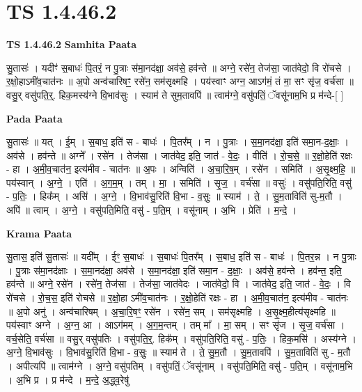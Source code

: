 \documentclass[17pt]{extarticle}
\begin{document}
\section*{ TS 1.4.46.2 }

\textbf{TS 1.4.46.2 } \newline
\textbf{Samhita Paata} \newline

सु॒तासः॑ । यदीꣳ॑ स॒बाधः॑ पि॒तरं॒ न पु॒त्राः स॑मा॒नद॑क्षा॒ अव॑से॒ हव॑न्ते ॥ अग्ने॒ रसे॑न॒ तेज॑सा॒ जात॑वेदो॒ वि रो॑चसे । र॒क्षो॒हाऽमी॑व॒चात॑नः ॥ अ॒पो अन्व॑चारिषꣳ॒॒ रसे॑न॒ सम॑सृक्ष्महि । पय॑स्वाꣳ अग्न॒ आऽग॑मं॒ तं मा॒ सꣳ सृ॑ज॒ वर्च॑सा ॥वसु॒र् वसु॑पति॒र्॒. हिक॒मस्य॑ग्ने वि॒भाव॑सुः । स्याम॑ ते सुम॒तावपि॑ ॥ त्वाम॑ग्ने॒ वसु॑पतिं॒ ॅवसू॑नाम॒भि प्र म॑न्दे-[ ] \newline

\textbf{Pada Paata} \newline

सु॒तासः॑ ॥ यत् । ई॒म् । स॒बाध॒ इति॑ स - बाधः॑ । पि॒तर᳚म् । न । पु॒त्राः । स॒मा॒नद॑क्षा॒ इति॑ समा॒न-द॒क्षाः॒ । अव॑से । हव॑न्ते ॥ अग्ने᳚ । रसे॑न । तेज॑सा । जात॑वेद॒ इति॒ जात॑ - वे॒दः॒ । वीति॑ । रो॒च॒से॒ ॥ र॒क्षो॒हेति॑ रक्षः - हा । अ॒मी॒व॒चात॑न॒ इत्य॑मीव - चात॑नः ॥ अ॒पः । अन्विति॑ । अ॒चा॒रि॒ष॒म् । रसे॑न । समिति॑ । अ॒सृ॒क्ष्म॒हि॒ ॥ पय॑स्वान् । अ॒ग्ने॒ । एति॑ । अ॒ग॒म॒म् । तम् । मा॒ । समिति॑ । सृ॒ज॒ । वर्च॑सा ॥ वसुः॑ । वसु॑पति॒रिति॒ वसु॑ - प॒तिः॒ । हिक᳚म् । असि॑ । अ॒ग्ने॒ । वि॒भाव॑सु॒रिति॑ वि॒भा - व॒सुः॒ ॥ स्याम॑ । ते॒ । सु॒म॒ताविति॑ सु-म॒तौ । अपि॑ ॥ त्वाम् । अ॒ग्ने॒ । वसु॑पति॒मिति॒ वसु॑ - प॒ति॒म् । वसू॑नाम् । अ॒भि । प्रेति॑ । म॒न्दे॒ ।  \newline


\textbf{Krama Paata} \newline

सु॒तास॒ इति॑ सु॒तासः॑ ॥ यदी᳚म् । ईꣳ॒॒ स॒बाधः॑ । स॒बाधः॑ पि॒तर᳚म् । स॒बाध॒ इति॑ स - बाधः॑ । पि॒तर॒न्न । न पु॒त्राः । पु॒त्राः स॑मा॒नद॑क्षाः । स॒मा॒नद॑क्षा॒ अव॑से । स॒मा॒नद॑क्षा॒ इति॑ समा॒न - द॒क्षाः॒ । अव॑से॒ हव॑न्ते । हव॑न्त॒ इति॒ हव॑न्ते ॥ अग्ने॒ रसे॑न । रसे॑न॒ तेज॑सा । तेज॑सा॒ जात॑वेदः । जात॑वेदो॒ वि । जात॑वेद॒ इति॒ जात॑ - वे॒दः॒ । वि रो॑चसे । रो॒च॒स॒ इति॑ रोचसे ॥ र॒क्षो॒हा ऽमी॑व॒चात॑नः । र॒क्षो॒हेति॑ रक्षः - हा । अ॒मी॒व॒चात॑न॒ इत्य॑मीव - चात॑नः ॥ अ॒पो अनु॑ । अन्व॑चारिषम् । अ॒चा॒रि॒षꣳ॒॒ रसे॑न । रसे॑न॒ सम् । सम॑सृक्ष्महि । अ॒सृ॒क्ष्म॒हीत्य॑सृक्ष्महि ॥ पय॑स्वाꣳ अग्ने । अ॒ग्न॒ आ । आऽग॑मम् । अ॒ग॒म॒न्तम् । तम् मा᳚ । मा॒ सम् । सꣳ सृ॑ज । सृ॒ज॒ वर्च॑सा । वर्च॒सेति॒ वर्च॑सा ॥ वसु॒र् वसु॑पतिः । वसु॑पति॒र्॒. हिक᳚म् । वसु॑पति॒रिति॒ वसु॑ - प॒तिः॒ । हिक॒मसि॑ । अस्य॑ग्ने । अ॒ग्ने॒ वि॒भाव॑सुः । वि॒भाव॑सु॒रिति॑ वि॒भा - व॒सुः॒ ॥ स्याम॑ ते । ते॒ सु॒म॒तौ । सु॒म॒तावपि॑ । सु॒म॒ताविति॑ सु - म॒तौ । अपीत्यपि॑ ॥ त्वाम॑ग्ने । अ॒ग्ने॒ वसु॑पतिम् । वसु॑पतिं॒ ॅवसू॑नाम् । वसु॑पति॒मिति॒ वसु॑ - प॒ति॒म् । वसू॑नाम॒भि । अ॒भि प्र । प्र म॑न्दे । म॒न्दे॒ अ॒द्ध्व॒रेषु॑ \newline
\end{document}

